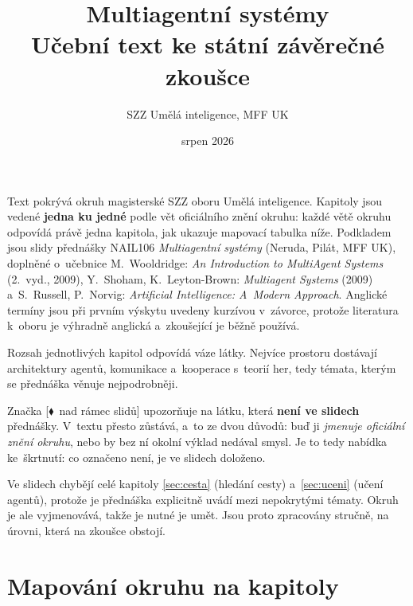 \documentclass[11pt,a4paper]{article}
\title{\textbf{Multiagentní systémy}\\[0.3em]\large Učební text ke státní závěrečné zkoušce}
\author{SZZ Umělá inteligence, MFF UK}
\date{srpen 2026}
\theoremstyle{definition}
\newcommand{\mimo}{\textcolor{markcol}{\textsf{\footnotesize[$\blacklozenge$~nad rámec slidů]}}}
\begin{document}
\maketitle

\vspace{-1.5em}

\begin{center}
\begin{minipage}{0.93\textwidth}
\small
Text pokrývá okruh  magisterské SZZ oboru Umělá inteligence.
Kapitoly jsou vedené \textbf{jedna ku jedné} podle vět oficiálního znění okruhu: každé
větě okruhu odpovídá právě jedna kapitola, jak ukazuje mapovací tabulka níže. Podkladem
jsou slidy přednášky NAIL106 \emph{Multiagentní systémy} (Neruda, Pilát, MFF UK),
doplněné o~učebnice M.~Wooldridge: \emph{An Introduction to MultiAgent Systems}
(2.~vyd., 2009), Y.~Shoham, K.~Leyton-Brown: \emph{Multiagent Systems} (2009)
a~S.~Russell, P.~Norvig: \emph{Artificial Intelligence: A~Modern Approach}.
Anglické termíny jsou při prvním výskytu uvedeny kurzívou v~závorce, protože literatura
k~oboru je výhradně anglická a~zkoušející je běžně používá.
\end{minipage}
\end{center}

\begin{center}
\begin{minipage}{0.93\textwidth}
\begin{poznbox}
\small
Rozsah jednotlivých kapitol odpovídá váze látky. Nejvíce prostoru dostávají architektury
agentů, komunikace a~kooperace s~teorií her, tedy témata, kterým se přednáška věnuje
nejpodrobněji.

Značka \mimo{} upozorňuje na látku, která \textbf{není ve slidech} přednášky. V~textu
přesto zůstává, a~to ze dvou důvodů: buď ji \emph{jmenuje oficiální znění okruhu}, nebo
by bez ní okolní výklad nedával smysl. Je to tedy nabídka ke~škrtnutí: co označeno není,
je ve slidech doloženo.

Ve slidech chybějí celé kapitoly \ref{sec:cesta} (hledání cesty) a~\ref{sec:uceni}
(učení agentů), protože je přednáška explicitně uvádí mezi nepokrytými tématy. Okruh je
ale vyjmenovává, takže je nutné je umět. Jsou proto zpracovány stručně, na úrovni, která
na zkoušce obstojí.
\end{poznbox}
\end{minipage}
\end{center}

\section*{Mapování okruhu na kapitoly}
\end{document}
